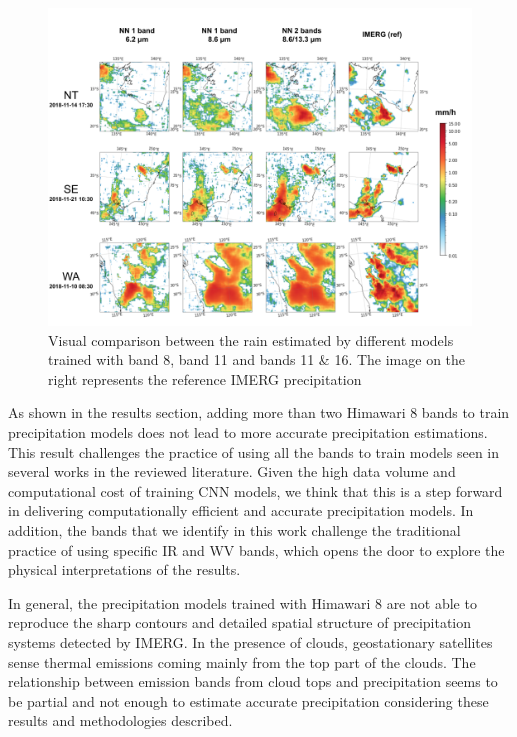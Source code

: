 \documentclass[3p,times]{elsarticle}
\begin{document}
\begin{figure}%
    \includegraphics[width=14cm]{output_cmp.png}
	\caption{Visual comparison between the rain estimated by different models trained with band 8, band 11 and bands 11 \& 16. The image on the right represents the reference IMERG precipitation}%
    \label{output_cmp}%
\end{figure}

As shown in the results section, adding more than two Himawari 8 bands to train precipitation models does not lead to more accurate precipitation estimations. This result challenges the practice of using all the bands to train models seen in several works in the reviewed literature. Given the high data volume and computational cost of training CNN models, we think that this is a step forward in delivering computationally efficient and accurate precipitation models. In addition, the bands that we identify in this work challenge the traditional practice of using specific IR and WV bands, which opens the door to explore the physical interpretations of the results.

In general, the precipitation models trained with Himawari 8 are not able to reproduce the sharp contours and detailed spatial structure of precipitation systems detected by IMERG. In the presence of clouds, geostationary satellites sense thermal emissions coming mainly from the top part of the clouds. The relationship between emission bands from cloud tops and precipitation seems to be partial and not enough to estimate accurate precipitation considering these results and methodologies described.
\end{document}
